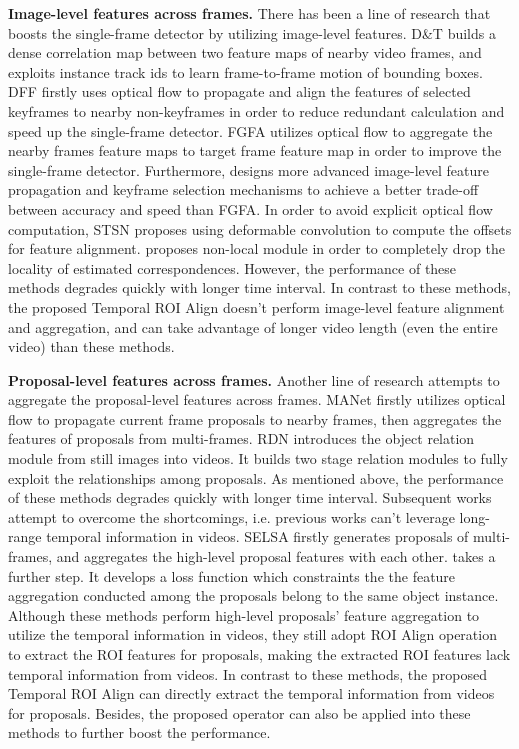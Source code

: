 \documentclass[letterpaper]{article} \usepackage{aaai21}  \usepackage{times}  \usepackage{helvet} \usepackage{courier}  \usepackage[hyphens]{url}  \usepackage{graphicx} \usepackage{hyperref}
\begin{document}
\textbf{Image-level features across frames.}
There has been a line of research that boosts the single-frame detector by utilizing image-level features. D\&T  \cite{feichtenhofer2017detect} builds a dense correlation map between two feature maps of nearby video frames, and exploits instance track ids to learn frame-to-frame motion of bounding boxes. DFF \cite{zhu2017deep} firstly uses optical flow to propagate and align the features of selected keyframes to nearby non-keyframes in order to reduce redundant calculation and speed up the single-frame detector. FGFA \cite{zhu2017flow} utilizes optical flow to aggregate the nearby frames feature maps to target frame feature map in order to improve the single-frame detector. Furthermore, \cite{zhu2018towards} designs more advanced image-level feature propagation and keyframe selection mechanisms to achieve a better trade-off between accuracy and speed than FGFA. In order to avoid explicit optical flow computation, STSN \cite{bertasius2018object} proposes using deformable convolution to compute the offsets for feature alignment. \cite{wang2018non} proposes non-local module in order to completely drop the locality of estimated correspondences. However, the performance of these methods degrades quickly with longer time interval. In contrast to these methods, the proposed Temporal ROI Align doesn't perform image-level feature alignment and aggregation, and can take advantage of longer video length (even the entire video) than these methods.

\textbf{Proposal-level features across frames.}
Another line of research attempts to  aggregate the proposal-level features across frames. MANet \cite{wang2018fully} firstly utilizes optical flow to propagate current frame proposals to nearby frames, then aggregates the features of proposals from multi-frames. RDN \cite{deng2019relation} introduces the object relation module from still images into videos. It builds two stage relation modules to fully exploit the relationships among proposals. As mentioned above, the performance of these methods degrades quickly with longer time interval. Subsequent works attempt to overcome the shortcomings, i.e. previous works can't leverage long-range temporal information in videos. SELSA \cite{wu2019sequence} firstly generates proposals of multi-frames, and aggregates the high-level proposal features with each other. \cite{shvets2019leveraging} takes a further step. It develops a loss function which constraints the the feature aggregation conducted among the proposals belong to the same object instance. Although these methods perform high-level proposals' feature aggregation to utilize the temporal information in videos, they still adopt ROI Align operation to extract the ROI features for proposals, making the extracted ROI features lack temporal information from videos. In contrast to these methods, the proposed Temporal ROI Align can directly extract the temporal information from videos for proposals. Besides, the proposed operator can also be applied into these methods to further boost the performance.  \vspace{-0.05cm}
\end{document}
